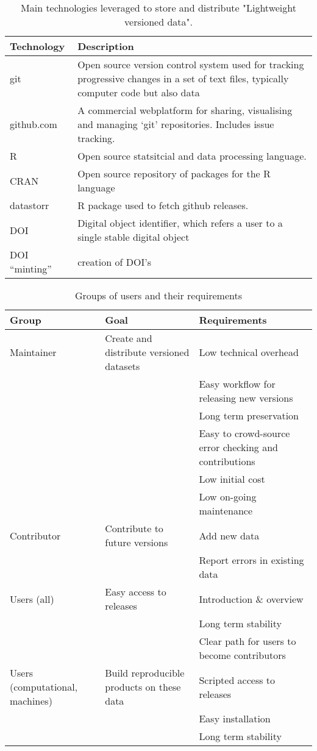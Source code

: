 \documentclass[a4paper,11pt]{article}
\begin{document}
\begin{table}[h!]
\centering
\caption{Main technologies leveraged to store and distribute "Lightweight versioned data".}
{\footnotesize
\vspace{1cm}
  \begin{tabular}{p{5cm}p{10cm}}
  \hline
  \textbf{Technology} & \textbf{Description} \\\hline
   git & Open source version control system used for tracking progressive changes in a set of text files, typically computer code but also data\\
   github.com & A commercial webplatform for sharing, visualising and managing `git' repositories. Includes issue tracking.\\
   R     &  Open source statsitcial and data processing language. \\
   CRAN  &  Open source repository of packages for the R language \\
   datastorr & R package used to fetch github releases. \\
   DOI & Digital object identifier, which refers a user to a single stable digital object \\ 
   DOI ``minting'' & creation of DOI's \\
   \hline
  \end{tabular}
  }
\label{tab:technologies}
\end{table}

\newpage

\begin{table}[h!]
\centering
\caption{Groups of users and their requirements}
{\footnotesize
\vspace{1cm}
  \begin{tabular}{p{2cm}p{5cm}p{7cm}}
  \hline
  \textbf{Group} & \textbf{Goal} & \textbf{Requirements} \\ \hline
  Maintainer & Create and distribute versioned datasets & Low technical overhead \\
    & & Easy workflow for releasing new versions \\
    & & Long term preservation \\
    & & Easy to crowd-source error checking and contributions \\
    & & Low initial cost \\
    & & Low on-going maintenance \\
  Contributor & Contribute to future versions & Add new data \\
    & & Report errors in existing data  \\
  Users (all) & Easy access to releases & Introduction \& overview \\
    & & Long term stability \\
    & & Clear path for users to become contributors \\
  Users (computational, machines) & Build reproducible products on these data & Scripted access to releases\\
    & &Easy installation\\
    & & Long term stability \\
  \hline
  \end{tabular}
  }
\label{tab:user_requirements}
\end{table}
\end{document}
